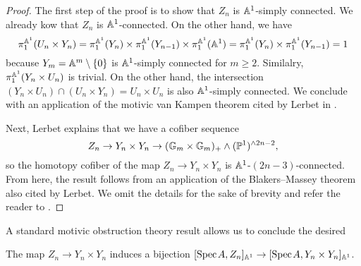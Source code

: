 \begin{proof}
    The first step of the proof is to show that $Z_n$ is $\mathbb{A}^1$-simply connected. We already kow that $Z_n$ is $\mathbb{A}^1$-connected. On the other hand, we have \[\pi_1^{\mathbb{A}^1}(U_n \times Y_n) = \pi_1^{\mathbb{A}^1}(Y_n) \times \pi_1^{\mathbb{A}^1}(Y_{n-1}) \times \pi_1^{\mathbb{A}^1}(\mathbb{A}^1) = \pi_1^{\mathbb{A}^1}(Y_n) \times \pi_1^{\mathbb{A}^1}(Y_{n-1})= 1\] because $Y_m = \mathbb{A}^m\setminus\{0\}$ is $\mathbb{A}^1$-simply connected for $m \geq 2$. Similalry, $\pi_1^{\mathbb{A}^1}(Y_n \times U_n)$ is trivial. On the other hand, the intersection $(Y_n \times U_n) \cap (U_n \times Y_n) = U_n \times U_n$ is also $\mathbb{A}^1$-simply connected. We conclude with an application of the motivic van Kampen theorem cited by Lerbet in \cite[Lemma 5.6]{LERBET2024109415}. 

    Next, Lerbet explains that we have a cofiber sequence
    \[
    Z_n \to Y_n \times Y_n \to (\mathbb{G}_m \times \mathbb{G}_m)_+ \wedge (\mathbb{P}^1)^{\wedge 2n-2},
    \]
    so the homotopy cofiber of the map $Z_n \to Y_n \times Y_n$ is $\mathbb{A}^1$-$(2n-3)$-connected. From here, the result follows from an application of the Blakers--Massey theorem also cited by Lerbet. We omit the details for the sake of brevity and refer the reader to \cite[Lemma 5.6]{LERBET2024109415}.
\end{proof}

A standard motivic obstruction theory result \cite[Lemma 2.22]{LERBET2024109415} allows us to conclude the desired

\begin{corollary}\label{cor:easy}
    The map $Z_n \to Y_n \times Y_n$ induces a bijection $[\text{Spec}\hspace{0.1em} A, Z_n]_{\mathbb{A}^1} \to [\text{Spec}\hspace{0.1em} A, Y_n \times Y_n]_{\mathbb{A}^1}$.
\end{corollary}

